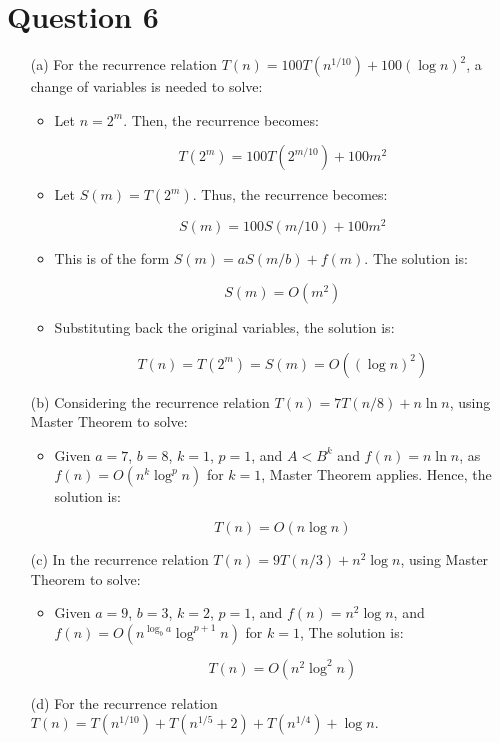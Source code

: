 \documentclass{article}
\begin{document}
\section*{Question 6}
\begin{enumerate}
    \item[(a)] For the recurrence relation \(T(n) = 100T(n^{1/10}) + 100(\log n)^2\), a change of variables is needed to solve:

          \begin{itemize}
              \item Let \(n = 2^m\). Then, the recurrence becomes:

                    \[T(2^m) = 100T(2^{m/10}) + 100m^2\]

              \item Let \(S(m) = T(2^m)\). Thus, the recurrence becomes:

                    \[S(m) = 100S(m/10) + 100m^2\]

              \item This is of the form \(S(m) = aS(m/b) + f(m)\). The solution is:

                    \[S(m) = O(m^2)\]

              \item Substituting back the original variables, the solution is:

                    \[T(n) = T(2^m) = S(m) = O((\log n)^2)\]
          \end{itemize}

    \item[(b)] Considering the recurrence relation \(T(n) = 7T(n/8) + n \ln n\), using Master Theorem to solve:

          \begin{itemize}
              \item Given \(a = 7\), \(b = 8\), \(k = 1\), \(p = 1\), and \(A < B^k\) and \(f(n) = n \ln n\), as \(f(n) = O(n^{k} \log^p n)\) for \(k = 1\), Master Theorem applies. Hence, the solution is:

                    \[T(n) = O(n \log n)\]
          \end{itemize}

    \item[(c)] In the recurrence relation \(T(n) = 9T(n/3) + n^2 \log n\), using Master Theorem to solve:

          \begin{itemize}
              \item Given \(a = 9\), \(b = 3\), \(k = 2\), \(p = 1\), and \(f(n) = n^2 \log n\), and \(f(n) = O(n^{\log_b a} \log^{p+1} n)\) for \(k = 1\), The solution is:

                    \[T(n) = O(n^2 \log^2 n)\]
          \end{itemize}

    \item[(d)] For the recurrence relation \(T(n) = T(n^{1/10}) + T(n^{1/5} + 2) + T(n^{1/4}) + \log n\).

\end{enumerate}
\newpage
\end{document}
